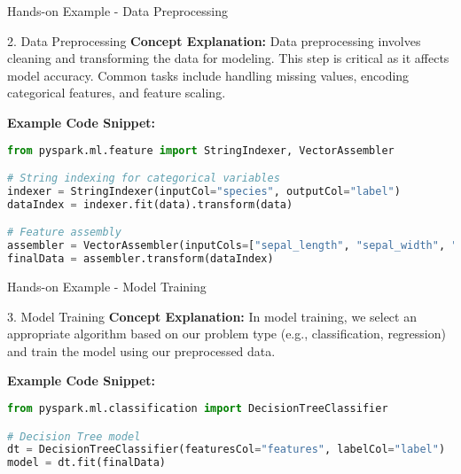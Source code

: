 \documentclass[aspectratio=169]{beamer}
\begin{document}
\begin{frame}[fragile]{Hands-on Example - Data Preprocessing}
    \begin{block}{2. Data Preprocessing}
        \textbf{Concept Explanation:}
        Data preprocessing involves cleaning and transforming the data for modeling. This step is critical as it affects model accuracy. Common tasks include handling missing values, encoding categorical features, and feature scaling.
        
        \textbf{Example Code Snippet:}
    \end{block}

    \begin{lstlisting}[language=python]
from pyspark.ml.feature import StringIndexer, VectorAssembler

# String indexing for categorical variables
indexer = StringIndexer(inputCol="species", outputCol="label")
dataIndex = indexer.fit(data).transform(data)

# Feature assembly
assembler = VectorAssembler(inputCols=["sepal_length", "sepal_width", "petal_length", "petal_width"], outputCol="features")
finalData = assembler.transform(dataIndex)
    \end{lstlisting}
\end{frame}

\begin{frame}[fragile]{Hands-on Example - Model Training}
    \begin{block}{3. Model Training}
        \textbf{Concept Explanation:}
        In model training, we select an appropriate algorithm based on our problem type (e.g., classification, regression) and train the model using our preprocessed data.

        \textbf{Example Code Snippet:}
    \end{block}

    \begin{lstlisting}[language=python]
from pyspark.ml.classification import DecisionTreeClassifier

# Decision Tree model
dt = DecisionTreeClassifier(featuresCol="features", labelCol="label")
model = dt.fit(finalData)
    \end{lstlisting}
\end{frame}
\end{document}
